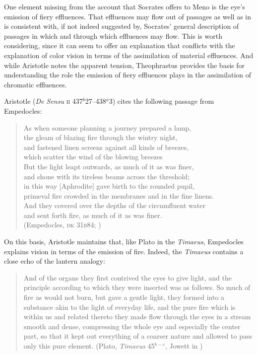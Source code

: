 One element missing from the account that Socrates offers to Meno is the eye's emission of fiery effluences. That effluences may flow out of passages as well as in is consistent with, if not indeed suggested by, Socrates' general description of passages in which and through which effluences may flow. This is worth considering, since it can seem to offer an explanation that conflicts with the explanation of color vision in terms of the assimilation of material effluences. And while Aristotle notes the apparent tension, Theophrastus provides the basis for understanding the role the emission of fiery effluences plays in the assimilation of chromatic effluences.

Aristotle (\emph{De Sensu} \textsc{ii} 437\( ^{b} \)27--438\( ^{a} \)3) cites the following passage from Empedocles:
\begin{verse}
	As when someone planning a journey prepared a lamp,\\
	the gleam of blazing fire through the wintry night,\\
	and fastened linen screens against all kinds of breezes,\\
	which scatter the wind of the blowing breezes\\
	But the light leapt outwards, as much of it as was finer,\\
	and shone with its tireless beams across the threshold;\\
	in this way [Aphrodite] gave birth to the rounded pupil,\\
	primeval fire crowded in the membranes and in the fine linens.\\
	And they covered over the depths of the circumfluent water\\
	and sent forth fire, as much of it as was finer.\\
	(Empedocles, \textsc{dk} 31\textsc{b}84; \citealt[103 259]{Inwood:2001ve})
\end{verse}
On this basis, Aristotle maintains that, like Plato in the \emph{Timaeus}, Empedocles explains vision in terms of the emission of fire. Indeed, the \emph{Timaeus} contains a close echo of the lantern analogy: 
\begin{quote}
	And of the organs they first contrived the eyes to give light, and the principle according to which they were inserted was as follows. So much of fire as would not burn, but gave a gentle light, they formed into a substance akin to the light of everyday life, and the pure fire which is within us and related thereto they made flow through the eyes in a stream smooth and dense, compressing the whole eye and especially the center part, so that it kept out everything of a coarser nature and allowed to pass only this pure element. (Plato, \emph{Timaeus} 45\( ^{b-c} \), Jowett in \citealt{Hamilton:1989fk})
\end{quote}
